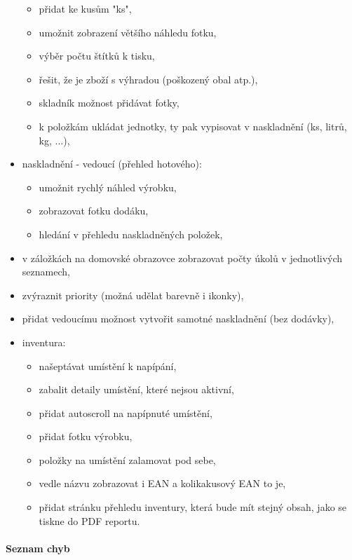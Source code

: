 \begin{itemize}
	\begin{itemize}
		\item přidat ke kusům "ks",
		\item umožnit zobrazení většího náhledu fotku,
		\item výběr počtu štítků k tisku,
		\item řešit, že je zboží s výhradou (poškozený obal atp.),
		\item skladník možnost přidávat fotky,
		\item k položkám ukládat jednotky, ty pak vypisovat v naskladnění (ks, litrů, kg, ...),
	\end{itemize}
	\item naskladnění - vedoucí (přehled hotového):
	\begin{itemize}
		\item umožnit rychlý náhled výrobku,
		\item zobrazovat fotku dodáku,
		\item hledání v přehledu naskladněných položek,
	\end{itemize}
	\item v záložkách na domovské obrazovce zobrazovat počty úkolů v jednotlivých seznamech,
	\item zvýraznit priority (možná udělat barevně i ikonky),
	\item přidat vedoucímu možnost vytvořit samotné naskladnění (bez dodávky),
	\item inventura:
	\begin{itemize}
		\item našeptávat umístění k napípání,
		\item zabalit detaily umístění, které nejsou aktivní,
		\item přidat autoscroll na napípnuté umístění,
		\item přidat fotku výrobku,
		\item položky na umístění zalamovat pod sebe,
		\item vedle názvu zobrazovat i EAN a kolikakusový EAN to je,
		\item přidat stránku přehledu inventury, která bude mít stejný obsah, jako se tiskne do PDF reportu.
	\end{itemize}
\end{itemize}

\paragraph{Seznam chyb}

